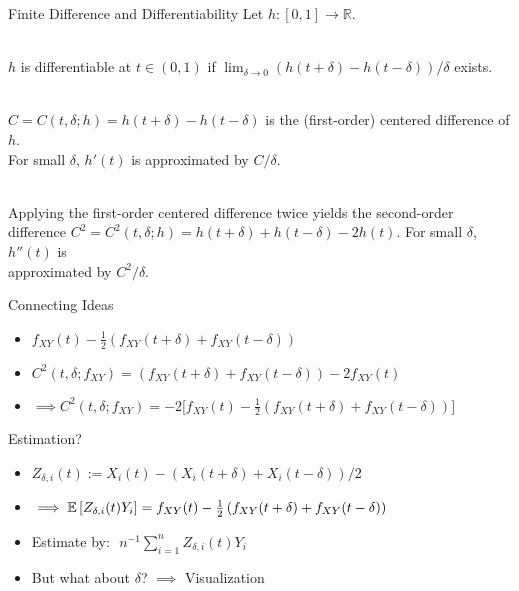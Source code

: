 \begin{frame}{Finite Difference and Differentiability}
    \vspace{-1cm}
    Let $h: [0, 1] \to \mathbb{R}$.

    \vspace{0.25cm}
    \\
        \quad $h$ is differentiable at $t \in (0, 1)$ if
        $\lim_{\delta \to 0} (h(t + \delta) - h(t - \delta)) / \delta$ exists.

    \vspace{0.5cm}
    \\
        \quad $C = C(t, \delta; h) = h(t + \delta) - h(t - \delta)$ is the (first-order)
        centered difference of $h$.\\
        \quad For small $\delta$, $h'(t)$ is approximated by $C / \delta$.

    \vspace{0.5cm}
    \\
        \quad Applying the first-order centered difference twice yields the second-order\\
        \quad difference $C^2 = C^2(t, \delta; h) = h(t + \delta) + h(t - \delta) -
        2h(t)$. For small $\delta$, $h''(t)$ is\\ \quad approximated by $C^2 / \delta$.

\end{frame}


\begin{frame}{Connecting Ideas}

    \begin{itemize}
    \setlength\itemsep{1.5em}
        \item[\labelitem] $f_{XY}(t) - \frac{1}{2}\left(f_{XY}(t + \delta) + f_{XY}(t -
            \delta)\right) $ \pause
        \item[\labelitem] $C^2(t, \delta; f_{XY}) = \left(f_{XY}(t + \delta) + f_{XY}(t
            - \delta)\right) - 2 f_{XY}(t)$ \pause
        \item[\labelitem] $\implies C^2(t, \delta; f_{XY}) = - 2 \Big[ f_{XY}(t) -
                \frac{1}{2} \left(f_{XY}(t + \delta) + f_{XY}(t - \delta)\right) \Big]$
    \end{itemize}

\end{frame}


\begin{frame}{Estimation?}
    \begin{itemize}
    \setlength\itemsep{1.5em}
        \item[\labelitem] $Z_{\delta, i}(t) := X_i(t) - \left(X_i(t + \delta) + X_i(t -
            \delta)\right) / 2$
        \item[\labelitem] $\implies \mathbb{E}\left[Z_{\delta, i}(t) Y_i\right] = f_{XY}(t) -
            \frac{1}{2}\left(f_{XY}(t + \delta) + f_{XY}(t - \delta)\right)$
        \item[\labelitem] Estimate by: $\,\, n^{-1}\sum_{i=1}^n Z_{\delta, i}(t) Y_i$ \pause
        \item[\labelitem] But what about $\delta$? \pause $\implies$ Visualization
    \end{itemize}
\end{frame}
